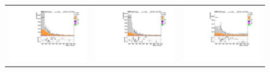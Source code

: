 \begin{figure}[htp]
\begin{tabular}{ccc}
\hspace{-0.5cm}
\includegraphics[scale=0.30]{fig/chapt7/qcd/qcd_mu_ch/Mass_H_binned15_24.pdf}
& \hspace{-1.20cm} \includegraphics[scale=0.30]{fig/chapt7/qcd/qcd_mu_ch/Mass_H_binned24_43.pdf}
& \hspace{-1.20cm} \includegraphics[scale=0.30]{fig/chapt7/qcd/qcd_mu_ch/Mass_H_binned43_Inf.pdf}\\

\end{tabular}
\end{figure}

